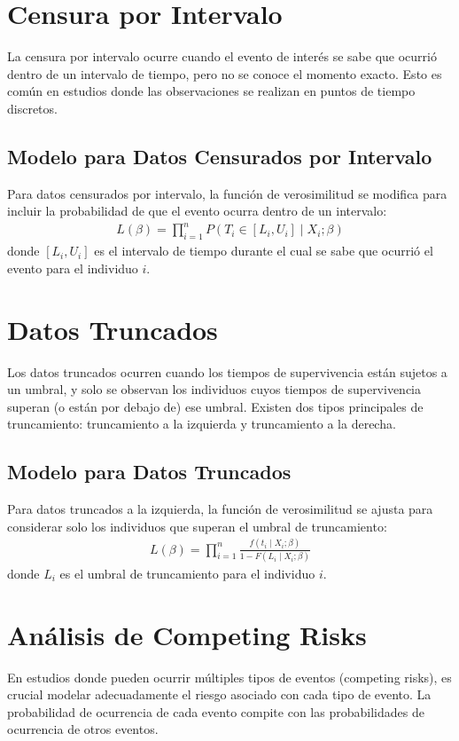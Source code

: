 \documentclass[a4paper]{report} %
\begin{document}
\section{Censura por Intervalo}
La censura por intervalo ocurre cuando el evento de inter\'es se sabe que ocurri\'o dentro de un intervalo de tiempo, pero no se conoce el momento exacto. Esto es com\'un en estudios donde las observaciones se realizan en puntos de tiempo discretos.

\subsection*{Modelo para Datos Censurados por Intervalo}
Para datos censurados por intervalo, la funci\'on de verosimilitud se modifica para incluir la probabilidad de que el evento ocurra dentro de un intervalo:
\begin{eqnarray*}
L(\beta) = \prod_{i=1}^n P(T_i \in [L_i, U_i] \mid X_i; \beta)
\end{eqnarray*}
donde $[L_i, U_i]$ es el intervalo de tiempo durante el cual se sabe que ocurri\'o el evento para el individuo $i$.

\section{Datos Truncados}
Los datos truncados ocurren cuando los tiempos de supervivencia est\'an sujetos a un umbral, y solo se observan los individuos cuyos tiempos de supervivencia superan (o est\'an por debajo de) ese umbral. Existen dos tipos principales de truncamiento: truncamiento a la izquierda y truncamiento a la derecha.

\subsection*{Modelo para Datos Truncados}
Para datos truncados a la izquierda, la funci\'on de verosimilitud se ajusta para considerar solo los individuos que superan el umbral de truncamiento:
\begin{eqnarray*}
L(\beta) = \prod_{i=1}^n \frac{f(t_i \mid X_i; \beta)}{1 - F(L_i \mid X_i; \beta)}
\end{eqnarray*}
donde $L_i$ es el umbral de truncamiento para el individuo $i$.

\section{An\'alisis de Competing Risks}
En estudios donde pueden ocurrir m\'ultiples tipos de eventos (competing risks), es crucial modelar adecuadamente el riesgo asociado con cada tipo de evento. La probabilidad de ocurrencia de cada evento compite con las probabilidades de ocurrencia de otros eventos.
\end{document}
